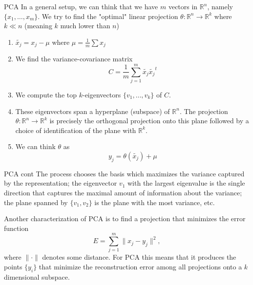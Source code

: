 \documentclass{beamer}
\begin{document}
\begin{frame}{PCA}
	In a general setup, we can think that we have $m$ vectors in $\mathbb{R}^n$, namely $\{x_1, \ldots, x_m\}$. We try to find the "optimal" linear projection $\theta \colon \mathbb{R}^n \to \mathbb{R}^k$ where $k \ll n$ (meaning $k$ much lower than $n$)
	\begin{enumerate}
	\item $\tilde{x_j} = x_j -\mu$ where $\mu= \frac{1}{m} \sum x_j$
	\item We find the variance-covariance matrix 
	\begin{equation*}
		C=\frac{1}{m} \sum_{j=1}^m \tilde{x_j} \tilde{x_j}^t
	\end{equation*}
	\item We compute the top $k$-eigenvectors $\{v_1, \ldots, v_k\}$ of $C$.
	\item These eigenvectors span a hyperplane (subspace) of $\mathbb{R}^n$. The projection $\theta \colon \mathbb{R}^n \to \mathbb{R}^k$ is precisely the orthogonal projection onto this plane followed by a choice of identification of the plane with $\mathbb{R}^k$.
	\item We can think $\theta$ as 
	\begin{equation*}
		y_j= \theta(\tilde{x_j})+ \mu
	\end{equation*}
	
	\end{enumerate}


\end{frame}

\begin{frame}{PCA cont}
	The process chooses the basis which maximizes the variance captured by the representation; the eigenvector $v_1$ with the largest eigenvalue is the single direction that captures the maximal amount of information about the variance; the plane spanned by $\{v_1,v_2\}$ is the plane with the most variance, etc.
	
	Another characterization of PCA is to find a projection that minimizes the error function
	\begin{equation*}
		E= \sum_{j=1}^m \| x_j -y_j \|^2, 
	\end{equation*}
	where $\| \cdot \|$ denotes some distance. For PCA this means that it produces the points $\{y_i\}$ that minimize the reconstruction error among all projections onto a $k$ dimensional subspace. 
\end{frame}
\end{document}
